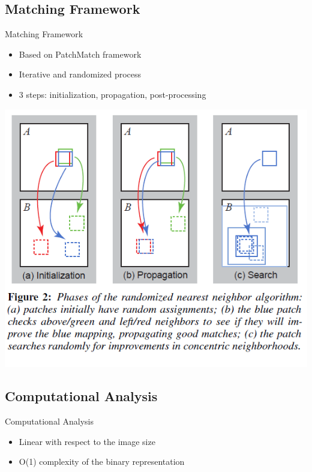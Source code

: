 %
%
\subsection{Matching Framework}
\begin{frame}{Matching Framework}

\begin{itemize}
\item Based on PatchMatch framework
\item Iterative and randomized process
\item 3 steps: initialization, propagation, post-processing
\end{itemize}
\centering
\includegraphics[scale=0.7]{pictures/fig1_patchmatch}
\end{frame}

\subsection{Computational Analysis}
\begin{frame}{Computational Analysis}
\begin{itemize}
\item Linear with respect to the image size
\item O(1) complexity of the binary representation
\end{itemize}
\end{frame}

